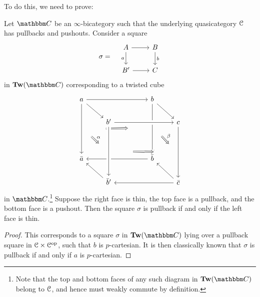\documentclass[main.tex]{subfiles}
\begin{document}
To do this, we need to prove:
\begin{lemma}
  \label{lemma:pullbacks_in_ttw}
  Let $\CC$ be an $\infty$-bicategory such that the underlying quasicategory $\mathcal{C}$ has pullbacks and pushouts. Consider a square
  \begin{equation*}
    \sigma =\quad
    \begin{tikzcd}
      A
      \arrow[r]
      \arrow[d, swap, "a"]
      & B
      \arrow[d, "b"]
      \\
      B'
      \arrow[r]
      & C
    \end{tikzcd}
  \end{equation*}
  in $\Tw(\CC)$ corresponding to a twisted cube
  \begin{equation*}
    \begin{tikzcd}
      a
      \arrow[rrr]
      \arrow[dr, ""{name=TL, right}]
      \arrow[ddd, ""{name=R1, right}]
      &&& b
      \arrow[ddd, ""{name=L2, left}, ""{name=R2, right}]
      \arrow[dr, ""{name=TR, left}]
      \arrow[from=R1, to=L2, Rightarrow, shorten=7ex]
      \\
      & b'
      \arrow[rrr, crossing over]
      &&& c
      \arrow[ddd, ""{name=L4, left}"]
      \\
      \\
      \bar{a}
      &&& \bar{b}
      \arrow[lll]
      \\
      & \bar{b}'
      \arrow[from=uuu, crossing over, ""{name=L3, left}, ""{name=R3, right}]
      \arrow[ul]
      &&& \bar{c}
      \arrow[lll]
      \arrow[ul]
      \arrow[from=R1, to=L3, Rightarrow, shorten=3ex, "\alpha"]
      \arrow[from=R3, to=L4, Rightarrow, crossing over, shorten=7ex]
      \arrow[from=R2, to=L4, Rightarrow, shorten=3ex, "\beta"]
    \end{tikzcd}
  \end{equation*}
  in $\CC$.\footnote{Note that the top and bottom faces of any such diagram in $\Tw(\CC)$ belong to $\mathcal{C}$, and hence must weakly commute by definition.} Suppose the right face is thin, the top face is a pullback, and the bottom face is a pushout. Then the square $\sigma$ is pullback if and only if the left face is thin.
\end{lemma}
\begin{proof}
  This corresponds to a square $\sigma$ in $\Tw(\CC)$ lying over a pullback square in $\mathcal{C} \times \mathcal{C}^{\mathrm{op}}$, such that $b$ is $p$-cartesian. It is then classically known that $\sigma$ is pullback if and only if $a$ is $p$-cartesian.
\end{proof}
\end{document}
